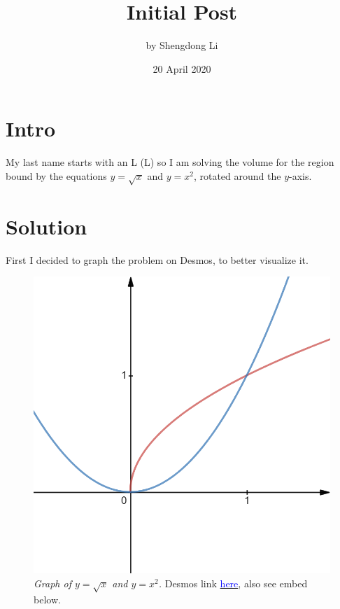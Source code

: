 \documentclass[letterpaper, 12pt]{article}
\begin{document}
\title{Initial Post}
\author{by Shengdong Li}
\date{20 April 2020}
\maketitle

\section{Intro}
My last name starts with an L (L) so I am solving the volume for the region bound by the equations $y=\sqrt{x}$ and $y=x^2$, rotated around the $y$-axis.
\section{Solution}
First I decided to graph the problem on Desmos, to better visualize it.
\begin{figure}[h]
    \begin{center}
        \includegraphics[scale=.3]{visualization.png}
        \caption{\textit{Graph of $y=\sqrt{x}$ and $y=x^2$.} Desmos link \href{https://www.desmos.com/calculator/xqjovtmzu0}{\textcolor{blue}{here}}, also see embed below.}
    \end{center}
\end{figure}
\end{document}
